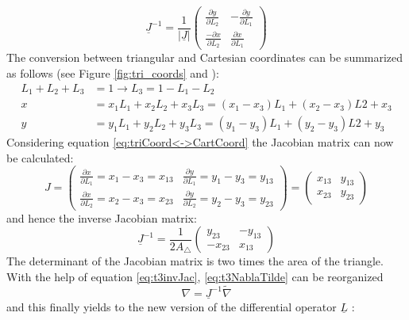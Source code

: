   \begin{equation}
  \underline{J}^{-1} = \frac{1}{|\underline{J}|} \begin{pmatrix}
  \frac{\partial y}{\partial L_2} & -\frac{\partial y}{\partial L_1} \\
  \frac{-\partial x}{\partial L_2} & \frac{\partial x}{\partial L_1}
  \end{pmatrix}
  \end{equation}
  The conversion between triangular and Cartesian coordinates can be summarized as follows (see Figure \ref{fig:tri_coords} and \cite{steinke2005finite}):
  \begin{align}\label{eq:triCoord<->CartCoord}
  L_1 + L_2 + L_3 &= 1 \rightarrow L_3 = 1-L_1-L_2 \nonumber\\
  x &= x_1L_1 + x_2L_2 + x_3L_3 = (x_1-x_3)L_1 + (x_2-x_3)L2 + x_3\\
  y &= y_1L_1 + y_2L_2 + y_3L_3 = (y_1-y_3)L_1 + (y_2-y_3)L2 + y_3 \nonumber
  \end{align}
  Considering equation \ref{eq:triCoord<->CartCoord} the Jacobian matrix can now be calculated:
  \begin{equation}
  J = \begin{pmatrix}
  \frac{\partial x}{\partial L_1} = x_1-x_3 = x_{13} & \frac{\partial y}{\partial L_1} = y_1-y_3 = y_{13}\\
  \frac{\partial x}{\partial L_2} = x_2-x_3 = x_{23} & \frac{\partial y}{\partial L_2} = y_2-y_3 = y_{23}
  \end{pmatrix} = \begin{pmatrix}
  x_{13} & y_{13}\\
  x_{23} & y_{23}
  \end{pmatrix}
  \end{equation}
  and hence the inverse Jacobian matrix:
  \begin{equation}\label{eq:t3invJac}
  \underline{J}^{-1} = \frac{1}{2 A_\triangle} \begin{pmatrix}
  y_{23} & -y_{13}\\
  -x_{23} & x_{13}
  \end{pmatrix}
  \end{equation}
  The determinant of the Jacobian matrix is two times the area of the triangle. With the help of equation \ref{eq:t3invJac}, \ref{eq:t3NablaTilde} can be reorganized
  \begin{equation}\label{eq:nabla=invJ*nabla-tilde}
  \nabla = \underline{J}^{-1} \tilde{\nabla}
  \end{equation}
  and this finally yields to the new version of the differential operator $\underline{L}$ \cite{steinke2005finite}:
